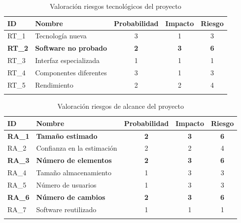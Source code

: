 \begin{enumerate}
\begin{itemize}
\begin{longtable}{l p{5cm} ccc}
\hline
\textbf{ID} & \textbf{Nombre} & \textbf{Probabilidad} & \textbf{Impacto} & \textbf{Riesgo} \\
\hline
\endhead
\endfoot
RT\_1 & 
Tecnología nueva &
3 &
1 &
3 
 \\
\textbf{RT\_2} & 
\textbf{Software no probado} &
\textbf{2} &
\textbf{3} &
\textbf{6} 
 \\
RT\_3 & 
Interfaz especializada &
1 &
1 &
1 
 \\
RT\_4 & 
Componentes diferentes &
3 &
1 &
3 
 \\
RT\_5 & 
Rendimiento &
2 &
2 &
4 
 \\
\hline
\caption{Valoración riesgos tecnológicos del proyecto}\label{ries_tecno_valoracion}\\
\end{longtable}

\begin{longtable}{l p{5cm} ccc}
\hline
\textbf{ID} & \textbf{Nombre} & \textbf{Probabilidad} & \textbf{Impacto} & \textbf{Riesgo} \\
\hline
\endhead
\endfoot
\textbf{RA\_1} & 
\textbf{Tamaño estimado} &
\textbf{2} &
\textbf{3} &
\textbf{6} 
 \\
RA\_2 & 
Confianza en la estimación &
2 &
2 &
4 
 \\
\textbf{RA\_3} & 
\textbf{Número de elementos} &
\textbf{2} &
\textbf{3} &
\textbf{6} 
 \\
RA\_4 & 
Tamaño almacenamiento &
1 &
3 &
3 
 \\
RA\_5 & 
Número de usuarios &
1 &
3 &
3 
 \\
\textbf{RA\_6} & 
\textbf{Número de cambios} &
\textbf{2} &
\textbf{3} &
\textbf{6} 
 \\
RA\_7 & 
Software reutilizado &
1 &
1 &
1 
 \\
\hline
\caption{Valoración riesgos de alcance del proyecto}\label{ries_alcan_valoracion}\\
\end{longtable}


\end{itemize}
\end{enumerate}

